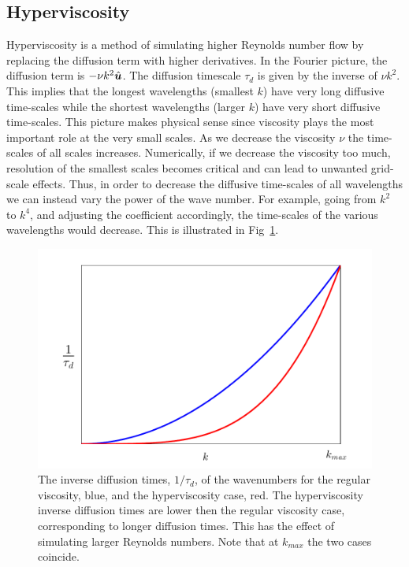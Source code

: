 \subsection{Hyperviscosity}
Hyperviscosity is a method of simulating higher Reynolds number flow by replacing the diffusion term with higher derivatives. In the Fourier picture, the diffusion term is $-\nu k^{2}\hat{\bm{u}}$. The diffusion timescale $\tau_{d}$ is given by the inverse of $\nu k^{2}$. This implies that the longest wavelengths (smallest $k$) have very long diffusive time-scales while the shortest wavelengths (larger $k$) have very short diffusive time-scales. This picture makes physical sense since viscosity plays the most important role at the very small scales. As we decrease the viscosity $\nu$ the time-scales of all scales increases. Numerically, if we decrease the viscosity too much, resolution of the smallest scales becomes critical and can lead to unwanted grid-scale effects. Thus, in order to decrease the diffusive time-scales of all wavelengths we can instead vary the power of the wave number. For example, going from $k^{2}$ to $k^{4}$, and adjusting the coefficient accordingly, the time-scales of the various wavelengths would decrease. This is illustrated in Fig~\ref{hyper_vis_example}.

\begin{figure}
\begin{center}
\includegraphics[width=\textwidth]{hyper_vis_example.pdf}
\caption{The inverse diffusion times, $1/\tau_{d}$, of the wavenumbers for the regular viscosity, blue, and the hyperviscosity case, red. The hyperviscosity inverse diffusion times are lower then the regular viscosity case, corresponding to longer diffusion times. This has the effect of simulating larger Reynolds numbers. Note that at $k_{max}$ the two cases coincide.}
\label{hyper_vis_example}
\end{center}
\end{figure}

